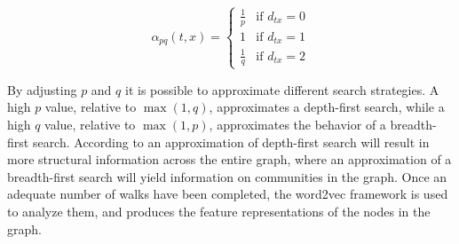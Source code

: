 \begin{equation}
\label{eq:bias}
\alpha_{pq}(t,x)=
\begin{cases}
  \frac{1}{p} & \text{if } d_{tx}=0 \\
  1           & \text{if } d_{tx}=1 \\
  \frac{1}{q} & \text{if } d_{tx}=2
\end{cases}
\end{equation}

By adjusting $p$ and $q$ it is possible to approximate different search strategies. A high $p$ value, relative to $\max(1,q)$, approximates a depth-first search, while a high $q$ value, relative to $\max(1,p)$, approximates the behavior of a breadth-first search. According to \cite{node2vec} an approximation of depth-first search will result in more structural information across the entire graph, where an approximation of a breadth-first search will yield information on communities in the graph.
Once an adequate number of walks have been completed, the word2vec framework is used to analyze them, and produces the feature representations of the nodes in the graph.